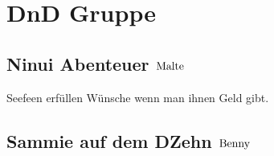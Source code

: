 \chapter{DnD Gruppe}

\section{Ninui Abenteuer \hfill $\rm{Malte}$}
Seefeen erfüllen Wünsche wenn man ihnen Geld gibt.
\section{Sammie auf dem DZehn \hfill $\rm{Benny}$}
